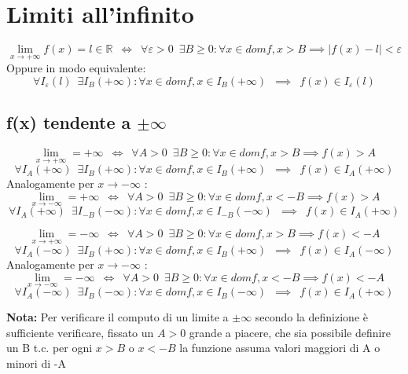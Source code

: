 \documentclass[10pt, oneside]{book}
\theoremstyle{plain}
\begin{document}
\section{Limiti all'infinito}
\begin{defin}
\[\lim \limits_{x \rightarrow +\infty} f(x) = l \in \mathbb{R} \enspace \Longleftrightarrow \enspace \forall \varepsilon > 0 \enspace \exists B \geq 0 : \forall x \in dom f, x > B \implies |f(x) - l| < \varepsilon\]
Oppure in modo equivalente:
\[\forall I_\varepsilon(l) \enspace \exists I_B(+\infty) : \forall x \in dom f, x \in I_B(+\infty) \enspace \implies \enspace f(x) \in I_\varepsilon(l)\]
\end{defin}
\subsection{f(x) tendente a $\pm \infty$}
\begin{defin}
\[\lim \limits_{x \rightarrow +\infty} = +\infty \enspace \Longleftrightarrow \enspace \forall A > 0 \enspace \exists B \geq 0 : \forall x \in domf, x > B \implies f(x) > A\]
\[\forall I_A(+\infty) \enspace \exists I_B(+\infty) : \forall x \in dom f, x \in I_B(+\infty) \enspace \implies \enspace f(x) \in I_A(+\infty)\]
Analogamente per $x \rightarrow -\infty$ :
\[\lim \limits_{x \rightarrow -\infty} = +\infty \enspace \Longleftrightarrow \enspace \forall A > 0 \enspace \exists B \geq 0 : \forall x \in domf, x < -B \implies f(x) > A\]
\[\forall I_A(+\infty) \enspace \exists I_{-B}(-\infty) : \forall x \in dom f, x \in I_{-B}(-\infty) \enspace \implies \enspace f(x) \in I_A(+\infty)\]
\end{defin}
\begin{defin}
\[\lim \limits_{x \rightarrow +\infty} = -\infty \enspace \Longleftrightarrow \enspace \forall A > 0 \enspace \exists B \geq 0 : \forall x \in domf, x > B \implies f(x) < -A\]
\[\forall I_A(-\infty) \enspace \exists I_B(+\infty) : \forall x \in dom f, x \in I_B(+\infty) \enspace \implies \enspace f(x) \in I_{A}(-\infty)\]
Analogamente per $x \rightarrow -\infty$ :
\[\lim \limits_{x \rightarrow -\infty} = -\infty \enspace \Longleftrightarrow \enspace \forall A > 0 \enspace \exists B \geq 0 : \forall x \in domf, x < -B \implies f(x) < -A\]
\[\forall I_{A}(-\infty) \enspace \exists I_{B}(-\infty) : \forall x \in dom f, x \in I_{B}(-\infty) \enspace \implies \enspace f(x) \in I_{A}(+\infty)\]
\end{defin}
\textbf{Nota: } Per verificare il computo di un limite a $\pm \infty$ secondo la definizione è sufficiente verificare, fissato un $A > 0$ grande a piacere, che sia possibile definire un B t.c. per ogni $x > B$ o $x < -B$ la funzione assuma valori maggiori di A o minori di -A
\end{document}
